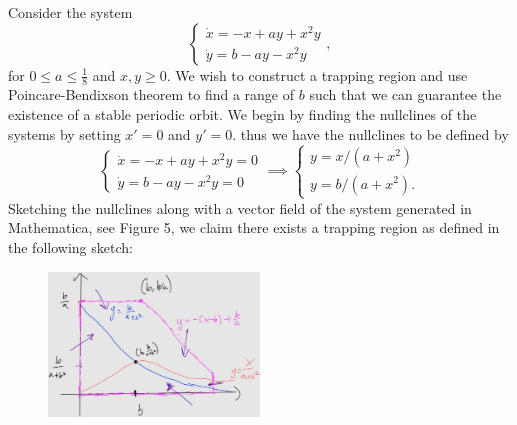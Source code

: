 \documentclass[12pt]{report}
\begin{document}
\begin{solution}
    \noindent
    Consider the system
    \begin{equation*}
        \left\{\begin{array}{l}
        \dot{x}=-x+a y+x^{2} y  \\
        \dot{y}=b-a y-x^{2} y 
        \end{array}\right.,
    \end{equation*}
    for $0 \leq a \leq \frac{1}{8}$ and $x,y \geq 0$. We wish to construct a trapping region and use Poincare-Bendixson theorem to find a range of $b$ such that we can guarantee the existence of a stable periodic orbit. We begin by finding the nullclines of the systems by setting $x' =0$ and $y'=0$. thus we have the nullclines to be defined by
    \[
        \begin{cases}
            \dot{x}=-x+a y+x^{2} y = 0\\
            \dot{y}=b-a y-x^{2} y = 0
        \end{cases} \implies \begin{cases}
            y = x/(a+x^2)\\
            y = b/(a+x^2).      
        \end{cases}
    \]
    Sketching the nullclines along with a vector field of the system generated in Mathematica, see Figure 5, we claim there exists a trapping region as defined in the following sketch:
    \begin{figure}[H]
        \centering
        \hspace*{0cm}\includegraphics[width=0.5\textwidth,height=\textwidth,keepaspectratio]{images/8.jpg}

\end{figure}
\end{solution}
\end{document}
